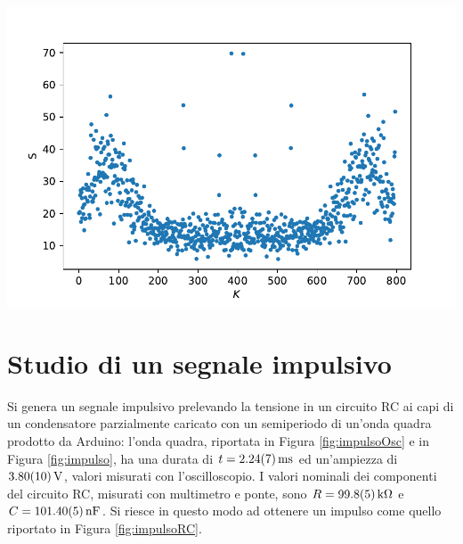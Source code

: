 \documentclass[10pt,oneside,a4paper]{article}
\newenvironment{Figure}
  {\par\medskip\noindent\minipage{\linewidth}}
  {\endminipage\par\medskip}
\begin{document}
\begin{multicols}{2}
\begin{Figure}
\begin{center}
	\label{fig:rumoreFiltro}
	\end{center}
\end{Figure}
\begin{Figure}
	\begin{center}
	\includegraphics[width=\linewidth]{studioRumoreFiltrato}
	\label{fig:studioRumoreFiltro}
	\end{center}
\end{Figure}


\section{Studio di un segnale impulsivo}
Si genera un segnale impulsivo prelevando la tensione in un circuito RC ai capi di un condensatore parzialmente caricato con un semiperiodo di un'onda quadra prodotto da Arduino: l'onda quadra, riportata in Figura \ref{fig:impulsoOsc} e in Figura \ref{fig:impulso}, ha una durata di $t = \SI{2.24 \pm 0.07}{\milli\second}$ ed un'ampiezza di $\SI{3.80 \pm 0.1}{\volt}$, valori misurati con l'oscilloscopio.
I valori nominali dei componenti del circuito RC, misurati con multimetro e ponte, sono $R = \SI{99.8 \pm 0.5}{\kilo\ohm}$ e $C = \SI{101.40 \pm 0.05}{nF}$. Si riesce in questo modo ad ottenere un impulso come quello riportato in Figura \ref{fig:impulsoRC}.


\end{multicols}
\end{document}

